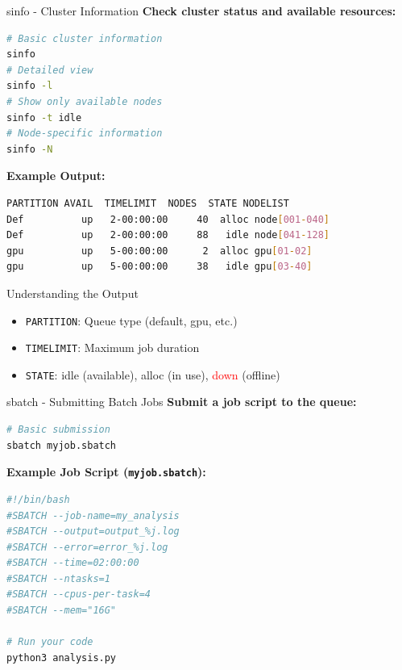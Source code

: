 \documentclass[aspectratio=169]{beamer}
\begin{document}
\begin{frame}[fragile]{sinfo - Cluster Information}
\textbf{Check cluster status and available resources:}

\begin{lstlisting}[language=bash]
# Basic cluster information
sinfo
# Detailed view
sinfo -l
# Show only available nodes
sinfo -t idle
# Node-specific information
sinfo -N
\end{lstlisting}

\vspace{0.3em}
\textbf{Example Output:}
\begin{lstlisting}[language=bash]
PARTITION AVAIL  TIMELIMIT  NODES  STATE NODELIST
Def          up   2-00:00:00     40  alloc node[001-040]
Def          up   2-00:00:00     88   idle node[041-128]
gpu          up   5-00:00:00      2  alloc gpu[01-02]
gpu          up   5-00:00:00     38   idle gpu[03-40]
\end{lstlisting}

\begin{exampleblock}{Understanding the Output}
\begin{itemize}
    \item \texttt{PARTITION}: Queue type (default, gpu, etc.)
    \item \texttt{TIMELIMIT}: Maximum job duration
    \item \texttt{STATE}: \textcolor{accentgreen}{idle} (available), \textcolor{ceciblue}{alloc} (in use), \textcolor{red}{down} (offline)
\end{itemize}
\end{exampleblock}
\end{frame}

\begin{frame}[fragile]{sbatch - Submitting Batch Jobs}
\textbf{Submit a job script to the queue:}

\begin{lstlisting}[language=bash]
# Basic submission
sbatch myjob.sbatch
\end{lstlisting}

\vspace{0.5em}
\textbf{Example Job Script (\texttt{myjob.sbatch}):}
\begin{lstlisting}[language=bash]
#!/bin/bash
#SBATCH --job-name=my_analysis
#SBATCH --output=output_%j.log
#SBATCH --error=error_%j.log
#SBATCH --time=02:00:00
#SBATCH --ntasks=1
#SBATCH --cpus-per-task=4
#SBATCH --mem="16G"

# Run your code
python3 analysis.py
\end{lstlisting}
\end{frame}
\end{document}

